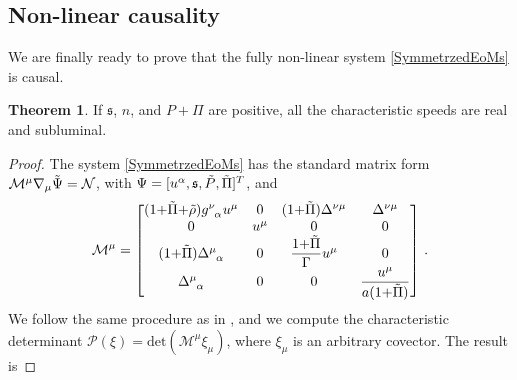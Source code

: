 \documentclass[a4paper, amsfonts, amssymb, amsmath, reprint, showkeys, nofootinbib, twoside,notitlepage,onecolumn]{revtex4-2}
\newcommand{\s}{{\mathfrak{s}}}
\theoremstyle{definition}
\theoremstyle{theorem}
\newtheorem{theorem}{Theorem}
\theoremstyle{corollary}
\begin{document}
\subsection{Non-linear causality}
\vspace{-0.2cm}


We are finally ready to prove that the fully non-linear system \eqref{SymmetrzedEoMs} is causal.



\begin{theorem}
If $\s$, $n$, and $P{+}\Pi$ are positive, all the characteristic speeds are real and subluminal.
\end{theorem}
\begin{proof}
The system \eqref{SymmetrzedEoMs} has the standard matrix form $\mathcal{M}^\mu \nabla_\mu \Tilde{\Psi}=\mathcal{N}$, with $\Psi=[u^\alpha,\s,\Tilde{P},\Tilde{\Pi} ]^T$, and
\begin{equation}
\mathcal{M}^\mu =    \begin{bmatrix}
(1{+}\Tilde{\Pi}{+}\Tilde{\rho})g\indices{^\nu _\alpha}u^\mu & 0 & (1{+}\Tilde{\Pi})\Delta^{\nu \mu} & \Delta^{\nu \mu}\\
0 & u^\mu & 0 & 0\\
(1{+}\Tilde{\Pi})\Delta\indices{^\mu _\alpha} & 0 & \dfrac{1{+}\Tilde{\Pi}}{\Gamma} u^\mu & 0\\
\Delta\indices{^\mu _\alpha} & 0 & 0 & \dfrac{u^\mu}{a(1{+}\Tilde{\Pi})}\\
\end{bmatrix} \, .
\end{equation}
We follow the same procedure as in \cite{Causality_bulk}, and we compute the characteristic determinant $\mathcal{P}(\xi)=\text{det}(\mathcal{M}^\mu \xi_\mu)$, where $\xi_\mu$ is an arbitrary covector. The result is

\end{proof}
\end{document}
